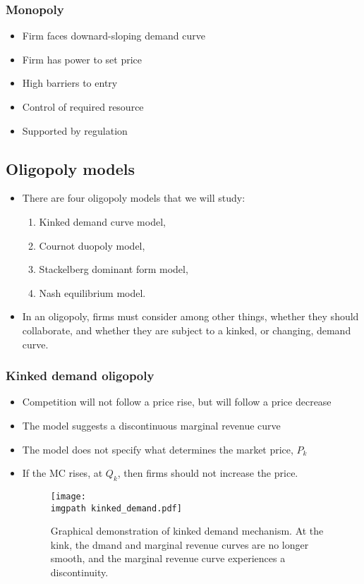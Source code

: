 \documentclass[../notes_compiled.tex]{subfiles}
\begin{document}
\subsubsection{Monopoly}
\begin{itemize}
\item Firm faces downard-sloping demand curve
\item Firm has power to set price 
\item High barriers to entry
\item Control of required resource
\item Supported by regulation
\end{itemize}

\subsection{Oligopoly models}
\begin{itemize}
\item There are four oligopoly models that we will study:
\begin{enumerate}
\item Kinked demand curve model,
\item Cournot duopoly model,
\item Stackelberg dominant form model,
\item Nash equilibrium model.
\end{enumerate}
\item In an oligopoly, firms must consider among other things, whether they should collaborate, and whether they are subject to a kinked, or changing, demand curve.
\end{itemize}

\subsubsection{Kinked demand oligopoly}
\begin{itemize}
\item Competition will not follow a price rise, but will follow a price decrease
\item The model suggests a discontinuous marginal revenue curve
\item The model does not specify what determines the market price, $P_{k}$
\item If the MC rises, at $Q_{k}$, then firms should not increase the price.

\begin{figure}[h]
  \centering
  \texttt{[image: \\imgpath kinked\_demand.pdf]}
  \caption{Graphical demonstration of kinked demand mechanism. At the kink, the dmand and marginal revenue curves are no longer smooth, and the marginal revenue curve experiences a discontinuity.}
\end{figure}

\end{itemize}
\end{document}
